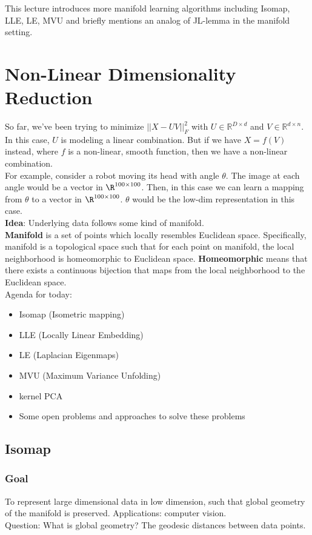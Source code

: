 
This lecture introduces more manifold learning algorithms including
Isomap, LLE, LE, MVU and briefly mentions an analog of JL-lemma in the
manifold setting. 

\section{Non-Linear Dimensionality Reduction}
So far, we've been trying to minimize $||X-UV||_F^2$ with  $U\in \mathbb{R}^{D\times d}$ and $V\in \mathbb{R}^{d\times n}$. In this case, $U$ is modeling a linear combination. But if we have $X=f(V)$ instead, where $f$ is a non-linear, smooth function, then we have a non-linear combination. \\
For example, consider a robot moving its head with angle $\theta$. The image at each angle would be a vector in $\R^{100 \times 100}$. Then, in this case we can learn a mapping from $\theta$ to a vector in $\R^{100 \times 100}$. $\theta$ would be the low-dim representation in this case.\\

\textbf{Idea}: Underlying data follows some kind of manifold. \\

\textbf{Manifold} is a set of points which locally resembles Euclidean space. Specifically, manifold is a topological space such that for each point on manifold, the local neighborhood is homeomorphic to Euclidean space. \textbf{Homeomorphic} means that there exists a continuous bijection that maps from the local neighborhood to the Euclidean space. \\

Agenda for today:
\begin{itemize}
\item Isomap (Isometric mapping)
\item LLE (Locally Linear Embedding)
\item LE (Laplacian Eigenmaps)
\item MVU (Maximum Variance Unfolding)
\item kernel PCA
\item Some open problems and approaches to solve these problems
\end{itemize}

\subsection{Isomap}
\subsubsection*{Goal}
To represent large dimensional data in low dimension, such that global geometry of the manifold is preserved. Applications: computer vision. \\
Question: What is global geometry? The geodesic distances between data points. 

